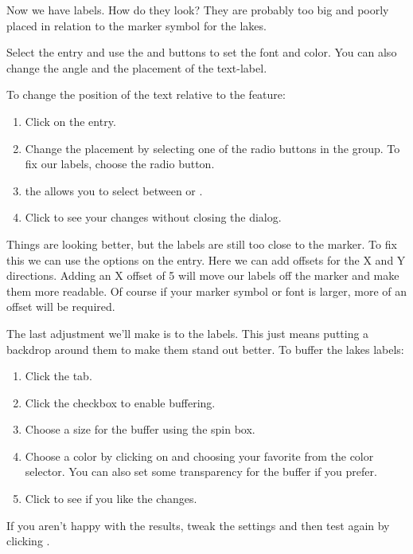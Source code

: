 Now we have labels. How do they look? They are probably too big and poorly
placed in relation to the marker symbol for the lakes.

Select the  entry and use the  and 
buttons to set the font and color. You can also change the angle and the
placement of the text-label.

To change the position of the text relative to the feature:

\begin{enumerate} 
\item Click on the  entry.
\item Change the placement by selecting one of the radio buttons
in the  group. To fix our labels, choose the
 radio button.
\item the  allows you to select between
 or .
\item Click  to see your changes without closing the dialog.
\end{enumerate} 

Things are looking better, but the labels are still too close to the marker. To
fix this we can use the options on the  entry. Here we can add
offsets for the X and Y directions. Adding an X offset of 5 will move our
labels off the marker and make them more readable. Of course if your marker
symbol or font is larger, more of an offset will be required.

The last adjustment we'll make is to  the labels. This just means
putting a backdrop around them to make them stand out better. To buffer the
lakes labels:

\begin{enumerate}
\item Click the  tab.
\item Click the  checkbox to enable buffering.
\item Choose a size for the buffer using the spin box.
\item Choose a color by clicking on  and choosing your
  favorite from the color selector. You can also set some transparency for the
  buffer if you prefer.
\item Click  to see if you like the changes.
\end{enumerate} 

If you aren't happy with the results, tweak the settings and then test again
by clicking .

